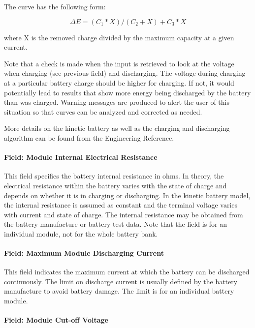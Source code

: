 The curve has the following form:

\begin{equation}
\Delta E = ({C_1}*X)/({C_2} + X) + {C_3}*X
\end{equation}

where X is the removed charge divided by the maximum capacity at a given current.

Note that a check is made when the input is retrieved to look at the voltage when charging (see previous field) and discharging. The voltage during charging at a particular battery charge should be higher for charging.  If not, it would potentially lead to results that show more energy being discharged by the battery than was charged. Warning messages are produced to alert the user of this situation so that curves can be analyzed and corrected as needed.

More details on the kinetic battery as well as the charging and discharging algorithm can be found from the Engineering Reference.

\paragraph{Field: Module Internal Electrical Resistance}\label{field-module-internal-electrical-resistance}

This field specifies the battery internal resistance in ohms. In theory, the electrical resistance within the battery varies with the state of charge and depends on whether it is in charging or discharging. In the kinetic battery model, the internal resistance is assumed as constant and the terminal voltage varies with current and state of charge. The internal resistance may be obtained from the battery manufacture or battery test data. Note that the field is for an individual module, not for the whole battery bank.

\paragraph{Field: Maximum Module Discharging Current}\label{field-maximum-module-discharging-current}

This field indicates the maximum current at which the battery can be discharged continuously. The limit on discharge current is usually defined by the battery manufacture to avoid battery damage. The limit is for an individual battery module.

\paragraph{Field: Module Cut-off Voltage}\label{field-module-cut-off-voltage}

